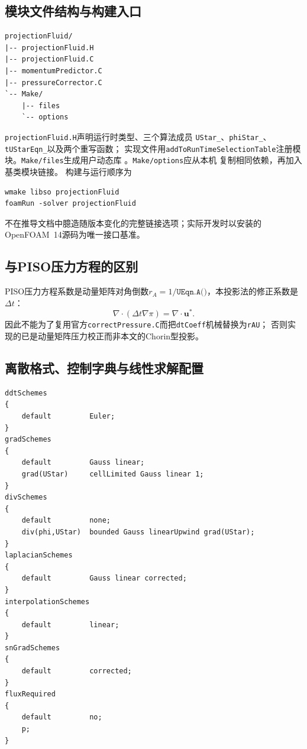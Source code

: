 \documentclass[UTF8,12pt,a4paper]{ctexart}
\numberwithin{equation}{section}
\newcommand{\dt}{\Delta t}
\begin{document}
\subsection{模块文件结构与构建入口}
\begin{lstlisting}[style=foam]
projectionFluid/
|-- projectionFluid.H
|-- projectionFluid.C
|-- momentumPredictor.C
|-- pressureCorrector.C
`-- Make/
    |-- files
    `-- options
\end{lstlisting}
\texttt{projectionFluid.H}声明运行时类型、三个算法成员
\texttt{UStar\_}、\texttt{phiStar\_}、\texttt{tUStarEqn\_}以及两个重写函数；
实现文件用\texttt{addToRunTimeSelectionTable}注册模块。\texttt{Make/files}生成用户动态库
。\texttt{Make/options}应从本机
复制相同依赖，再加入基类模块链接。
构建与运行顺序为
\begin{lstlisting}[style=foam]
wmake libso projectionFluid
foamRun -solver projectionFluid
\end{lstlisting}
不在推导文档中臆造随版本变化的完整链接选项；实际开发时以安装的OpenFOAM~14源码为唯一接口基准。

\subsection{与PISO压力方程的区别}
PISO压力方程系数是动量矩阵对角倒数$r_A=1/\texttt{UEqn.A()}$，本投影法的修正系数是$\dt$：
\[
  \boxed{\nabla\cdot(\dt\nabla\pi)=\nabla\cdot\bm u^*.}
\]
因此不能为了复用官方\texttt{correctPressure.C}而把\texttt{dtCoeff}机械替换为\texttt{rAU}；
否则实现的已是动量矩阵压力校正而非本文的Chorin型投影。

\subsection{离散格式、控制字典与线性求解配置}
\begin{lstlisting}[style=foam]
ddtSchemes
{
    default         Euler;
}
gradSchemes
{
    default         Gauss linear;
    grad(UStar)     cellLimited Gauss linear 1;
}
divSchemes
{
    default         none;
    div(phi,UStar)  bounded Gauss linearUpwind grad(UStar);
}
laplacianSchemes
{
    default         Gauss linear corrected;
}
interpolationSchemes
{
    default         linear;
}
snGradSchemes
{
    default         corrected;
}
fluxRequired
{
    default         no;
    p;
}
\end{lstlisting}
\end{document}
